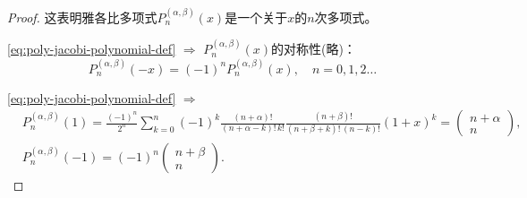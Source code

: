 \begin{subappendices}
\begin{proof}
这表明雅各比多项式$P_n^{(\alpha,\beta)}(x)$是一个关于$x$的$n$次多项式。

\eqref{eq:poly-jacobi-polynomial-def} $\Rightarrow$ $P_n^{(\alpha,\beta)}(x)$的对称性(略)：
\begin{equation}
  \label{eq:poly-jacobi-symmetry}
  P_n^{(\alpha,\beta)}(-x) = (-1)^n P_n^{(\alpha,\beta)}(x), \quad n=0,1,2 \ldots
\end{equation}

\eqref{eq:poly-jacobi-polynomial-def} $\Rightarrow$
\begin{align*}
  &P_n^{(\alpha,\beta)}(1) = \frac{(-1)^n}{2^n} \sum_{k=0}^{n} (-1)^k \frac{(n+\alpha)!}{(n+\alpha-k)! \, k!}\frac{(n+\beta)!}{(n+\beta+k)! \, (n-k)!} (1+x)^k = \begin{pmatrix}
  n+\alpha \\ n
  \end{pmatrix},\\
  & P_n^{(\alpha,\beta)}(-1) = (-1)^n \begin{pmatrix}
  n+\beta \\ n
  \end{pmatrix}.
\end{align*}
\end{proof}


\end{subappendices}
